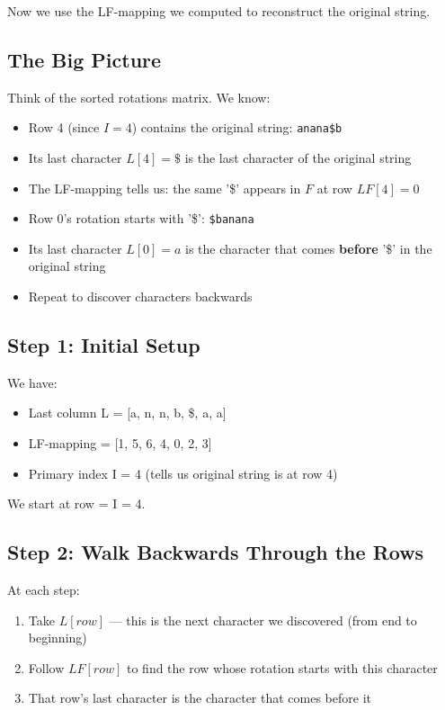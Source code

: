 \newpage
\begin{examplebox}[Step-by-Step Inversion of "annb\$aa" with I=4]

Now we use the LF-mapping we computed to reconstruct the original string.

\subsection*{The Big Picture}

Think of the sorted rotations matrix. We know:
\begin{itemize}
    \item Row 4 (since \(I=4\)) contains the original string: \texttt{anana\$b}
    \item Its last character \(L[4] = \$\) is the last character of the original string
    \item The LF-mapping tells us: the same '\$' appears in \(F\) at row \(LF[4] = 0\)
    \item Row 0's rotation starts with '\$': \texttt{\$banana}
    \item Its last character \(L[0] = a\) is the character that comes \textbf{before} '\$' in the original string
    \item Repeat to discover characters backwards
\end{itemize}

\subsection*{Step 1: Initial Setup}

We have:
\begin{itemize}
    \item Last column L = [a, n, n, b, \$, a, a]
    \item LF-mapping = [1, 5, 6, 4, 0, 2, 3]
    \item Primary index I = 4 (tells us original string is at row 4)
\end{itemize}

We start at row = I = 4.

\subsection*{Step 2: Walk Backwards Through the Rows}

At each step:
\begin{enumerate}
    \item Take \(L[row]\) — this is the next character we discovered (from end to beginning)
    \item Follow \(LF[row]\) to find the row whose rotation starts with this character
    \item That row's last character is the character that comes before it
\end{enumerate}


\end{examplebox}
